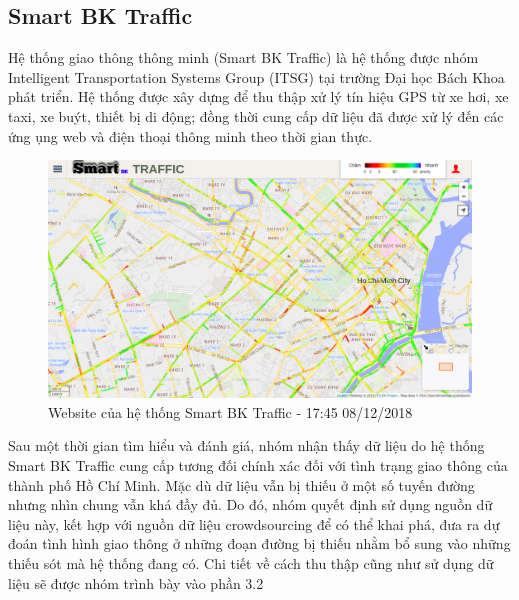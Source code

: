 \subsection{Smart BK Traffic}
Hệ thống giao thông thông minh (Smart BK Traffic) là hệ thống được nhóm Intelligent Transportation Systems Group (ITSG) tại trường Đại học Bách Khoa phát triển. Hệ thống được xây dựng để thu thập xử lý tín hiệu GPS từ xe hơi, xe taxi, xe buýt, thiết bị di động; đồng thời cung cấp dữ liệu đã được xử lý đến các ứng ụng web và điện thoại thông minh theo thời gian thực.

\begin{figure}[!ht]
	\begin{center}
		\includegraphics[width=1.0\textwidth]{images/smartbktraffic.png}
	\end{center}
	\caption{Website của hệ thống Smart BK Traffic - 17:45 08/12/2018}
\end{figure}

Sau một thời gian tìm hiểu và đánh giá, nhóm nhận thấy dữ liệu do hệ thống Smart BK Traffic cung cấp tương đối chính xác đối với tình trạng giao thông của thành phố Hồ Chí Minh. Mặc dù dữ liệu vẫn bị thiếu ở một số tuyến đường nhưng nhìn chung vẫn khá đầy đủ. Do đó, nhóm quyết định sử dụng nguồn dữ liệu này, kết hợp với nguồn dữ liệu crowdsourcing để có thể khai phá, đưa ra dự đoán tình hình giao thông ở những đoạn đường bị thiếu nhằm bổ sung vào những thiếu sót mà hệ thống đang có. Chi tiết về cách thu thập cũng như sử dụng dữ liệu sẽ được nhóm trình bày vào phần 3.2

